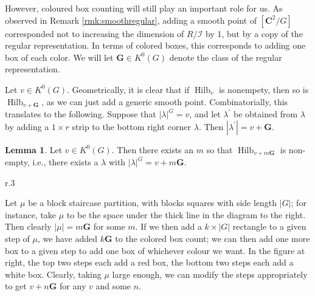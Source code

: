 \documentclass{amsart}[12pt]
\theoremstyle{definition}
\newtheorem{lemma}[dummy]{Lemma}
\newcommand{\C}{\mathbf{C}}
\newcommand{\II}{\mathcal{I}}
\newcommand{\Reg}{\mathbf{G}}
\DeclareMathOperator{\Hilb}{Hilb}
\begin{document}
However, coloured box counting will still play an important role for us.  As observed in Remark \ref{rmk:smoothregular}, adding a smooth point of $[\C^2/G]$ corresponded not to increasing the dimension of $R/\II$ by 1, but by a copy of the regular representation.  In terms of colored boxes, this corresponds to adding one box of each color.  We will let $\Reg\in K^0(G)$ denote the class of the regular representation.

Let $v\in K^0(G)$.  Geometrically, it is clear that if $\Hilb_v$ is nonempety, then so is $\Hilb_{v+\Reg}$, as we can just add a generic smooth point.  Combinatorially, this translates to the following. Suppose that $|\lambda|^G=v$, and let $\lambda^\prime$ be obtained from $\lambda$ by adding a $1\times r$ strip to the bottom right corner $\lambda$.  Then $|\lambda^\prime|=v+\Reg$.

\begin{lemma} \label{lem:nonempty-color}
Let $v\in K^0(G)$.  Then there exists an $m$ so that $\Hilb_{v+m\Reg}$ is non-empty, i.e., there exists a $\lambda$ with $|\lambda|^G=v+m\Reg$.
\end{lemma}


\begin{wrapfigure}{r}{.3\textwidth}
\end{wrapfigure}
Let $\mu$ be a block staircase partition, with blocks squares with side length $|G|$; for instance, take $\mu$ to be the space under the thick line in the diagram to the right.  Then clearly $|\mu|=m\Reg$ for some $m$.  If we then add a $k\times |G|$ rectangle to a given step of $\mu$, we have added $k\Reg$ to the colored box count; we can then add one more box to a given step to add one box of whichever colour we want.  In the figure at right, the top two steps each add a red box, the bottom two steps each add a white box.
Clearly, taking $\mu$ large enough, we can modify the steps appropriately to get $v+n\Reg$ for any $v$ and some $n$.
\end{document}
